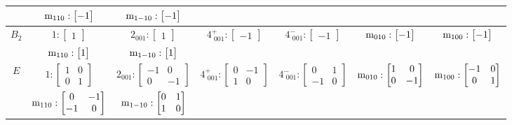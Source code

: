 \documentclass[fleqn,8pt,landscape]{jsarticle}
\begin{document}
\begin{longtable}{ccccccc}
& $ {\rm m}_{110}:\begin{bmatrix} -1 \end{bmatrix} $ & $ {\rm m}_{1-10}:\begin{bmatrix} -1 \end{bmatrix} $ & $  $ & $  $ & $  $ & $  $ \\ \hline
$ B_{2} $ & $ 1:\begin{bmatrix} 1 \end{bmatrix} $ & $ 2{}_{001}:\begin{bmatrix} 1 \end{bmatrix} $ & $ 4^{+}_{\,\,001}:\begin{bmatrix} -1 \end{bmatrix} $ & $ 4^{-}_{\,\,001}:\begin{bmatrix} -1 \end{bmatrix} $ & $ {\rm m}_{010}:\begin{bmatrix} -1 \end{bmatrix} $ & $ {\rm m}_{100}:\begin{bmatrix} -1 \end{bmatrix} $ \\
& $ {\rm m}_{110}:\begin{bmatrix} 1 \end{bmatrix} $ & $ {\rm m}_{1-10}:\begin{bmatrix} 1 \end{bmatrix} $ & $  $ & $  $ & $  $ & $  $ \\ \hline
$ E $ & $ 1:\begin{bmatrix} 1 & 0 \\ 0 & 1 \end{bmatrix} $ & $ 2{}_{001}:\begin{bmatrix} -1 & 0 \\ 0 & -1 \end{bmatrix} $ & $ 4^{+}_{\,\,001}:\begin{bmatrix} 0 & -1 \\ 1 & 0 \end{bmatrix} $ & $ 4^{-}_{\,\,001}:\begin{bmatrix} 0 & 1 \\ -1 & 0 \end{bmatrix} $ & $ {\rm m}_{010}:\begin{bmatrix} 1 & 0 \\ 0 & -1 \end{bmatrix} $ & $ {\rm m}_{100}:\begin{bmatrix} -1 & 0 \\ 0 & 1 \end{bmatrix} $ \\
& $ {\rm m}_{110}:\begin{bmatrix} 0 & -1 \\ -1 & 0 \end{bmatrix} $ & $ {\rm m}_{1-10}:\begin{bmatrix} 0 & 1 \\ 1 & 0 \end{bmatrix} $ & $  $ & $  $ & $  $ & $  $ \\
\end{longtable}
\end{document}
